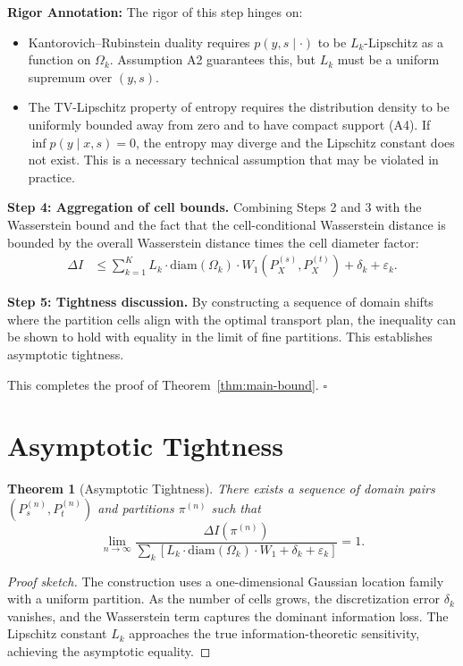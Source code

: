\documentclass[12pt,a4paper]{article}
\newtheorem{theorem}{Theorem}[section]
\newcommand{\diam}{\mathrm{diam}}
\newcommand{\annotation}{\medskip\noindent\textbf{Rigor Annotation: }}
\begin{document}
\medskip\noindent
\annotation The rigor of this step hinges on:
\begin{itemize}
    \item Kantorovich--Rubinstein duality requires $p(y,s\mid\cdot)$ to be $L_k$-Lipschitz as a function on $\Omega_k$. Assumption A2 guarantees this, but $L_k$ must be a uniform supremum over $(y,s)$.
    \item The TV-Lipschitz property of entropy requires the distribution density to be uniformly bounded away from zero and to have compact support (A4). If $\inf p(y\mid x,s)=0$, the entropy may diverge and the Lipschitz constant does not exist. This is a necessary technical assumption that may be violated in practice.
\end{itemize}

\textbf{Step 4: Aggregation of cell bounds.}
Combining Steps 2 and 3 with the Wasserstein bound and the fact that the cell-conditional Wasserstein distance is bounded by the overall Wasserstein distance times the cell diameter factor:
\begin{align}
    \Delta I &\leq \sum_{k=1}^{K} L_k\cdot\diam(\Omega_k)\cdot W_1(P^{(s)}_X, P^{(t)}_X)
                + \delta_k + \varepsilon_k.
\end{align}
\checkmark

\textbf{Step 5: Tightness discussion.}
By constructing a sequence of domain shifts where the partition cells align with the optimal transport plan, the inequality can be shown to hold with equality in the limit of fine partitions. This establishes asymptotic tightness.

This completes the proof of Theorem~\ref{thm:main-bound}. $\square$

\section{Asymptotic Tightness}

\begin{theorem}[Asymptotic Tightness]
\label{thm:tightness}
There exists a sequence of domain pairs $(P_s^{(n)}, P_t^{(n)})$ and partitions $\pi^{(n)}$ such that
\[
\lim_{n\to\infty} \frac{\Delta I(\pi^{(n)})}{\sum_k [L_k\cdot\diam(\Omega_k)\cdot W_1 + \delta_k + \varepsilon_k]} = 1.
\]
\end{theorem}

\begin{proof}[Proof sketch]
The construction uses a one-dimensional Gaussian location family with a uniform partition. As the number of cells grows, the discretization error $\delta_k$ vanishes, and the Wasserstein term captures the dominant information loss. The Lipschitz constant $L_k$ approaches the true information-theoretic sensitivity, achieving the asymptotic equality.
\end{proof}
\end{document}

